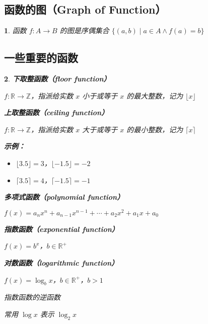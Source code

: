 \documentclass[UTF8]{report}
\theoremstyle{MyLineTheoremStyle} %
\theoremstyle{MyBlockTheoremStyle} %
\theoremstyle{MySubsubsectionStyle} %
\newtheorem{definition}{}
\begin{document}
\subsection{函数的图（Graph of Function）}

\begin{definition}
    函数 $f: A \to B$ 的图是序偶集合 $\{(a, b) \mid a \in A \land f(a) = b\}$\par
\end{definition}

\subsection{一些重要的函数}

\begin{definition}
    \textbf{下取整函数（floor function）}\par
    $f: \mathbb{R} \to \mathbb{Z}$，指派给实数 $x$ 小于或等于 $x$ 的最大整数，记为 $\lfloor x \rfloor$\par

    \textbf{上取整函数（ceiling function）}\par
    $f: \mathbb{R} \to \mathbb{Z}$，指派给实数 $x$ 大于或等于 $x$ 的最小整数，记为 $\lceil x \rceil$\par

    \textbf{示例：}\par
    \begin{itemize}
        \item $\lfloor 3.5 \rfloor = 3$，$\lfloor -1.5 \rfloor = -2$
        \item $\lceil 3.5 \rceil = 4$，$\lceil -1.5 \rceil = -1$
    \end{itemize}

    \textbf{多项式函数（polynomial function）}\par
    $f(x) = a_n x^n + a_{n-1} x^{n-1} + \cdots + a_2 x^2 + a_1 x + a_0$\par

    \textbf{指数函数（exponential function）}\par
    $f(x) = b^x$，$b \in \mathbb{R}^+$\par

    \textbf{对数函数（logarithmic function）}\par
    $f(x) = \log_b x$，$b \in \mathbb{R}^+$，$b > 1$\par
    指数函数的逆函数\par
    常用 $\log x$ 表示 $\log_2 x$\par


\end{definition}
\end{document}
